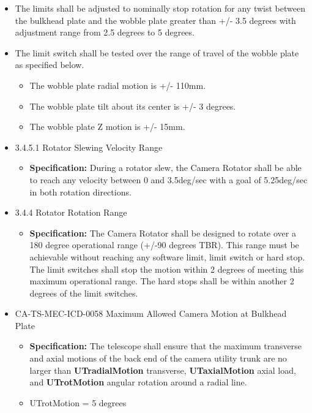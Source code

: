 \documentclass[SE,authoryear,toc, lsstdraft]{lsstdoc}
\begin{document}
\begin{itemize}
\item
  The limits shall be adjusted to nominally stop rotation for any twist
  between the bulkhead plate and the wobble plate greater than +/- 3.5
  degrees with adjustment range from 2.5 degrees to 5 degrees.
\item
  The limit switch shall be tested over the range of travel of the
  wobble plate as specified below.

  \begin{itemize}
  \item
    The wobble plate radial motion is +/- 110mm.
  \item
    The wobble plate tilt about its center is +/- 3 degrees.
  \item
    The wobble plate Z motion is +/- 15mm.
  \end{itemize}
\end{itemize}

\underline{}

\begin{itemize}
\item
  3.4.5.1 Rotator Slewing Velocity Range

  \begin{itemize}
  \item
    \textbf{Specification:} During a rotator slew, the Camera Rotator
    shall be able to reach any velocity between 0 and 3.5deg/sec with a
    goal of 5.25deg/sec in both rotation directions.
  \end{itemize}
\item
  3.4.4 Rotator Rotation Range

  \begin{itemize}
  \item
    \textbf{Specification:} The Camera Rotator shall be designed to
    rotate over a 180 degree operational range (+/-90 degrees TBR). This
    range must be achievable without reaching any software limit, limit
    switch or hard stop. The limit switches shall stop the motion within
    2 degrees of meeting this maximum operational range. The hard stops
    shall be within another 2 degrees of the limit switches.
  \end{itemize}
\end{itemize}

\underline{}

\begin{itemize}
\item
  CA-TS-MEC-ICD-0058 Maximum Allowed Camera Motion at Bulkhead Plate

  \begin{itemize}
  \item
    \textbf{Specification:} The telescope shall ensure that the maximum
    transverse and axial motions of the back end of the camera utility
    trunk are no larger than \textbf{UTradialMotion} transverse,
    \textbf{UTaxialMotion} axial load, and \textbf{UTrotMotion} angular
    rotation around a radial line.
  \item
    UTrotMotion = 5 degrees
  \end{itemize}
\end{itemize}
\end{document}
